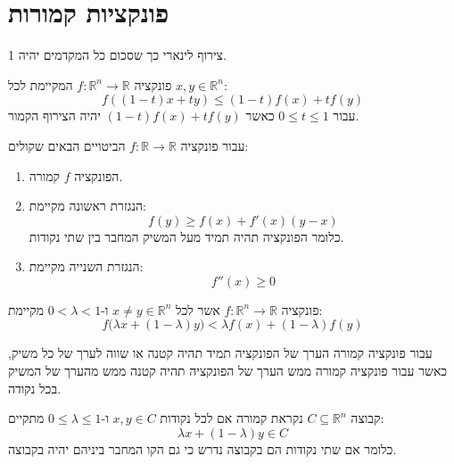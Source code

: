 \documentclass{tstextbook}
\begin{document}
\section{פונקציות קמורות}

\begin{definition}
צירוף לינארי כך שסכום כל המקדמים יהיה 1.

\end{definition}
\begin{definition}
פונקציה \(f:\mathbb{R}^{n}\to \mathbb{R}\) המקיימת לכל \(x,y \in \mathbb{R}^{n}\):
$$f((1-t)x+ty)\leq (1-t)f(x)+tf(y)$$
עבור \(0\leq t \leq 1\) כאשר \((1-t)f(x)+tf(y)\) יהיה הצירוף הקמור.

\end{definition}
\begin{proposition}
עבור פונקציה \(f:\mathbb{R}\to \mathbb{R}\) הביטויים הבאים שקולים:

  \begin{enumerate}
    \item הפונקציה \(f\) קמורה. 


    \item הנגזרת ראשונה מקיימת: 
$$f(y)\geq f(x)+f'(x)(y-x)$$
כלומר הפונקציה תהיה תמיד מעל המשיק המחבר בין שתי נקודות.


    \item הנגזרת השנייה מקיימת: 
$$f''(x)\geq 0$$


  \end{enumerate}
\end{proposition}
\begin{definition}
פונקציה \(f:\mathbb{R}^{n}\to \mathbb{R}\) אשר לכל \(x\neq y \in \mathbb{R}^{n}\) ו-\(0<\lambda<1\) מקיימת:
$$f{\big(}\lambda x+(1-\lambda)y{\big)}<\lambda f(x)+(1-\lambda)f(y)$$

\end{definition}
\begin{remark}
עבור פונקציה קמורה הערך של הפונקציה תמיד תהיה קטנה או שווה לערך של כל משיק, כאשר עבור פונקציה קמורה ממש הערך של הפונקציה תהיה קטנה ממש מהערך של המשיק בכל נקודה.

\end{remark}
\begin{definition}
קבוצה \(C\subseteq \mathbb{R}^{n}\) נקראת קמורה אם לכל נקודות \(x,y \in {C}\) ו-\(0\leq \lambda \leq 1\) מתקיים:
$$\lambda x+(1-\lambda)y\in C$$
כלומר אם שתי נקודות הם בקבוצה נדרש כי גם הקו המחבר ביניהם יהיה בקבוצה.

\end{definition}
\end{document}
